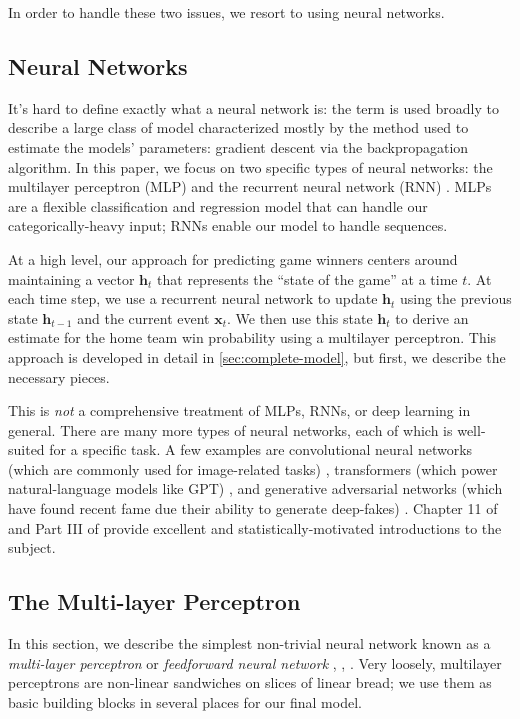 In order to handle these two issues, we resort to using neural networks.

\subsection{Neural Networks}

It's hard to define exactly what a neural network is: the term is used broadly to describe a large class of model characterized mostly by the method used to estimate the models' parameters: gradient descent via the backpropagation algorithm. In this paper, we focus on two specific types of neural networks: the multilayer perceptron (MLP) \cite[\S 13.2.2]{PML} and the recurrent neural network (RNN) \cite[\S 15.2]{PML}. MLPs are a flexible classification and regression model that can handle our categorically-heavy input; RNNs enable our model to handle sequences.

At a high level, our approach for predicting game winners centers around maintaining a vector $\mathbf h_t$ that represents the ``state of the game'' at a time $t$. At each time step, we use a recurrent neural network to update $\mathbf h_t$ using the previous state $\mathbf h_{t-1}$ and the current event $\mathbf x_t$. We then use this state $\mathbf h_t$ to derive an estimate for the home team win probability using a multilayer perceptron. This approach is developed in detail in \autoref{sec:complete-model}, but first, we describe the necessary pieces.

This is \emph{not} a comprehensive treatment of MLPs, RNNs, or deep learning in general. There are many more types of neural networks, each of which is well-suited for a specific task. A few examples are convolutional neural networks (which are commonly used for image-related tasks) \cite[\S 14]{PML}, transformers (which power natural-language models like GPT) \cite{attention-is-all-you-need}, and generative adversarial networks (which have found recent fame due their ability to generate deep-fakes) \cite[19.3.6.2]{PML}. Chapter 11 of \textcite{ESL} and Part III of \textcite{PML} provide excellent and statistically-motivated introductions to the subject.

\subsection{The Multi-layer Perceptron}

In this section, we describe the simplest non-trivial neural network known as a \emph{multi-layer perceptron} or \emph{feedforward neural network} \cite[\S 10.1]{ISL}, \cite[\S 11.3]{ESL}, \cite[13.2]{PML}. Very loosely, multilayer perceptrons are non-linear sandwiches on slices of linear bread; we use them as basic building blocks in several places for our final model.

